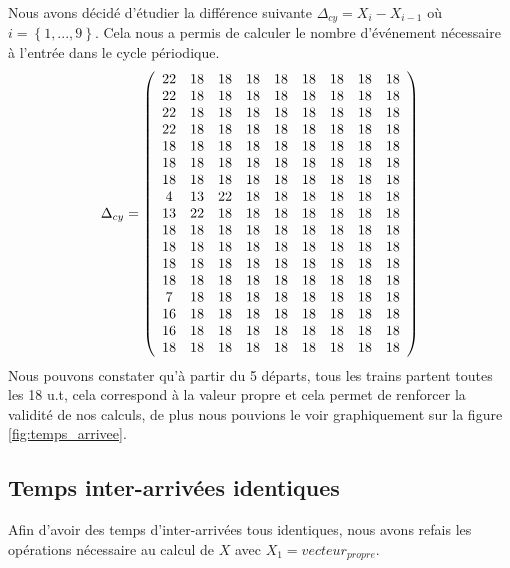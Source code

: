 Nous avons décidé d'étudier la différence suivante $\Delta_{cy} = X_i - X_{i-1}$ où $i = \left\lbrace 1,...,9\right\rbrace$. Cela nous a permis de calculer le nombre d'événement nécessaire à l'entrée dans le cycle périodique.
\begin{equation}
\Delta_{cy} = 
\left(
\begin{array}{cc cc cc cc cc}
22 & 18 & 18 & 18 & 18 & 18 & 18 & 18 & 18 \\
22 & 18 & 18 & 18 & 18 & 18 & 18 & 18 & 18 \\
22 & 18 & 18 & 18 & 18 & 18 & 18 & 18 & 18 \\
22 & 18 & 18 & 18 & 18 & 18 & 18 & 18 & 18 \\
18 & 18 & 18 & 18 & 18 & 18 & 18 & 18 & 18 \\
18 & 18 & 18 & 18 & 18 & 18 & 18 & 18 & 18 \\
18 & 18 & 18 & 18 & 18 & 18 & 18 & 18 & 18 \\
4 &  13 & 22 & 18 & 18 & 18 & 18 & 18 & 18 \\
13 & 22 & 18 & 18 & 18 & 18 & 18 & 18 & 18 \\
18 & 18 & 18 & 18 & 18 & 18 & 18 & 18 & 18 \\
18 & 18 & 18 & 18 & 18 & 18 & 18 & 18 & 18 \\
18 & 18 & 18 & 18 & 18 & 18 & 18 & 18 & 18 \\
18 & 18 & 18 & 18 & 18 & 18 & 18 & 18 & 18 \\
7 &  18 & 18 & 18 & 18 & 18 & 18 & 18 & 18 \\
16 & 18 & 18 & 18 & 18 & 18 & 18 & 18 & 18 \\
16 & 18 & 18 & 18 & 18 & 18 & 18 & 18 & 18 \\
18 & 18 & 18 & 18 & 18 & 18 & 18 & 18 & 18 
\end{array}
\right)
\end{equation}
Nous pouvons constater qu'à partir du  5\ieme{} départs, tous les trains partent toutes les 18 u.t, cela correspond à la valeur propre et cela permet de renforcer la validité de nos calculs, de plus nous pouvions le voir graphiquement sur la figure \ref{fig:temps_arrivee}.

\subsection{Temps inter-arrivées identiques}
Afin d'avoir des temps d'inter-arrivées tous identiques, nous avons refais les opérations nécessaire au calcul de $X$ avec $X_1=vecteur_{propre}$.

